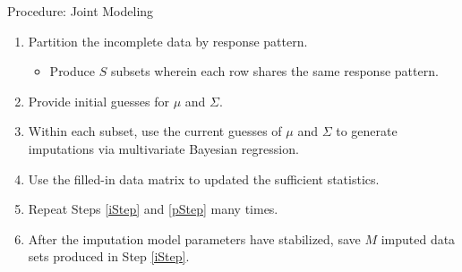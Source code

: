 \documentclass{beamer}\usepackage[]{graphicx}\usepackage[]{color}
\begin{document}

\begin{frame}{Procedure: Joint Modeling}
  
  \begin{enumerate}
  \item Partition the incomplete data by response pattern.
    \begin{itemize}
    \item Produce $S$ subsets wherein each row shares the same response pattern.
    \end{itemize}
    \vc
  \item Provide initial guesses for $\mu$ and $\Sigma$.
    \vb
  \item Within each subset, use the current guesses of $\mu$ and $\Sigma$ to 
    generate imputations via multivariate Bayesian regression. \label{iStep}
    \vb
  \item Use the filled-in data matrix to updated the sufficient statistics.
    \label{pStep}
    \vb
  \item Repeat Steps \ref{iStep} and \ref{pStep} many times.
    \vb
  \item After the imputation model parameters have stabilized, save $M$ imputed 
    data sets produced in Step \ref{iStep}.
  \end{enumerate}
  
\end{frame}

\watermarkoff %
\end{document}
